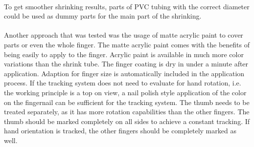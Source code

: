 \\To get smoother shrinking results, parts of PVC tubing with the correct diameter could be used as dummy parts for the main part of the shrinking.\\
\\Another approach that was tested was the usage of matte acrylic paint to cover parts or even the whole finger. The matte acrylic paint comes with the benefits of being easily to apply to the finger. Acrylic paint is available in much more color variations than the shrink tube. The finger coating is dry in under a minute after application. Adaption for finger size is automatically included in the application process. If the tracking system does not need to evaluate for hand rotation, i.e. the working principle is a top on view, a nail polish style application of the color on the fingernail can be sufficient for the tracking system. The thumb needs to be treated separately, as it has more rotation capabilities than the other fingers. The thumb should be marked completely on all sides to achieve a constant tracking. If hand orientation is tracked, the other fingers should be completely marked as well.
